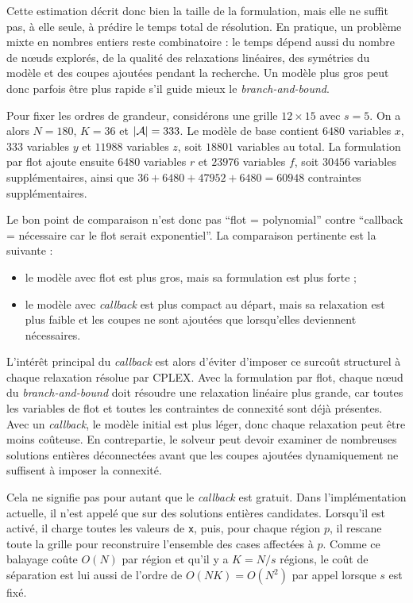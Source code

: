 Cette estimation décrit donc bien la taille de la formulation, mais elle ne suffit pas, à elle seule, à prédire le temps total de résolution. En pratique, un problème mixte en nombres entiers reste combinatoire : le temps dépend aussi du nombre de n\oe uds explorés, de la qualité des relaxations linéaires, des symétries du modèle et des coupes ajoutées pendant la recherche. Un modèle plus gros peut donc parfois être plus rapide s'il guide mieux le \textit{branch-and-bound}.

Pour fixer les ordres de grandeur, considérons une grille \(12 \times 15\) avec \(s = 5\). On a alors \(N = 180\), \(K = 36\) et \(\left|\mathcal{A}\right| = 333\). Le modèle de base contient \(6480\) variables \(x\), \(333\) variables \(y\) et \(11988\) variables \(z\), soit \(18801\) variables au total. La formulation par flot ajoute ensuite \(6480\) variables \(r\) et \(23976\) variables \(f\), soit \(30456\) variables supplémentaires, ainsi que \(36 + 6480 + 47952 + 6480 = 60948\) contraintes supplémentaires.

Le bon point de comparaison n'est donc pas ``flot = polynomial'' contre ``callback = nécessaire car le flot serait exponentiel''. La comparaison pertinente est la suivante :
\begin{itemize}
    \item le modèle avec flot est plus gros, mais sa formulation est plus forte ;
    \item le modèle avec \textit{callback} est plus compact au départ, mais sa relaxation est plus faible et les coupes ne sont ajoutées que lorsqu'elles deviennent nécessaires.
\end{itemize}

L'intérêt principal du \textit{callback} est alors d'éviter d'imposer ce surcoût structurel à chaque relaxation résolue par CPLEX. Avec la formulation par flot, chaque n\oe ud du \textit{branch-and-bound} doit résoudre une relaxation linéaire plus grande, car toutes les variables de flot et toutes les contraintes de connexité sont déjà présentes. Avec un \textit{callback}, le modèle initial est plus léger, donc chaque relaxation peut être moins coûteuse. En contrepartie, le solveur peut devoir examiner de nombreuses solutions entières déconnectées avant que les coupes ajoutées dynamiquement ne suffisent à imposer la connexité.

Cela ne signifie pas pour autant que le \textit{callback} est gratuit. Dans l'implémentation actuelle, il n'est appelé que sur des solutions entières candidates. Lorsqu'il est activé, il charge toutes les valeurs de \texttt{x}, puis, pour chaque région \(p\), il rescane toute la grille pour reconstruire l'ensemble des cases affectées à \(p\). Comme ce balayage coûte \(O(N)\) par région et qu'il y a \(K = N/s\) régions, le coût de séparation est lui aussi de l'ordre de \(O(NK) = O(N^2)\) par appel lorsque \(s\) est fixé.

